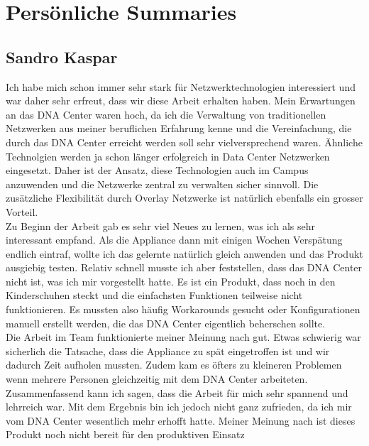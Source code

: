 \section{Persönliche Summaries}
\subsection{Sandro Kaspar}
Ich habe mich schon immer sehr stark für Netzwerktechnologien interessiert und war daher sehr erfreut, dass wir diese Arbeit erhalten haben. Mein Erwartungen an das DNA Center waren hoch, da ich die Verwaltung von traditionellen Netzwerken aus meiner beruflichen Erfahrung kenne und die Vereinfachung, die durch das DNA Center erreicht werden soll sehr vielversprechend waren. Ähnliche Technolgien werden ja schon länger erfolgreich in Data Center Netzwerken eingesetzt. Daher ist der Ansatz, diese Technologien auch im Campus anzuwenden und die Netzwerke zentral zu verwalten sicher sinnvoll. Die zusätzliche Flexibilität durch Overlay Netzwerke ist natürlich ebenfalls ein grosser Vorteil. \\
Zu Beginn der Arbeit gab es sehr viel Neues zu lernen, was ich als sehr interessant empfand. Als die Appliance dann mit einigen Wochen Verspätung endlich eintraf, wollte ich das gelernte natürlich gleich anwenden und das Produkt ausgiebig testen. Relativ schnell musste ich aber feststellen, dass das DNA Center nicht ist, was ich mir vorgestellt hatte. Es ist ein Produkt, dass noch in den Kinderschuhen steckt und die einfachsten Funktionen teilweise nicht funktionieren. Es mussten also häufig Workarounds gesucht oder Konfigurationen manuell erstellt werden, die das DNA Center eigentlich beherschen sollte. \\
Die Arbeit im Team funktionierte meiner Meinung nach gut. Etwas schwierig war sicherlich die Tatsache, dass die Appliance zu spät eingetroffen ist und wir dadurch Zeit aufholen mussten. Zudem kam es öfters zu kleineren Problemen wenn mehrere Personen gleichzeitig mit dem DNA Center arbeiteten. \\
Zusammenfassend kann ich sagen, dass die Arbeit für mich sehr spannend und lehrreich war. Mit dem Ergebnis bin ich jedoch nicht ganz zufrieden, da ich mir vom DNA Center wesentlich mehr erhofft hatte. Meiner Meinung nach ist dieses Produkt noch nicht bereit für den produktiven Einsatz

